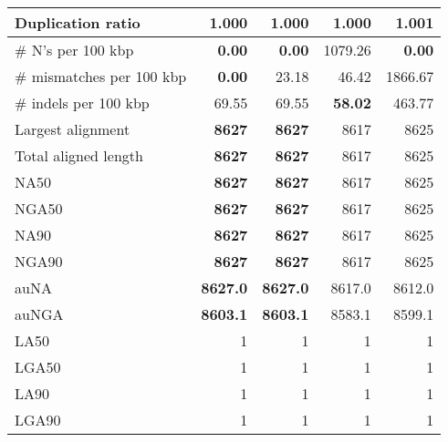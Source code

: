 \documentclass[12pt,a4paper]{article}
\begin{document}
\begin{table}[ht]
\begin{center}
\begin{tabular}{|l*{4}{|r}|}
Duplication ratio & {\bf 1.000} & {\bf 1.000} & {\bf 1.000} & 1.001 \\ \hline
\# N's per 100 kbp & {\bf 0.00} & {\bf 0.00} & 1079.26 & {\bf 0.00} \\ \hline
\# mismatches per 100 kbp & {\bf 0.00} & 23.18 & 46.42 & 1866.67 \\ \hline
\# indels per 100 kbp & 69.55 & 69.55 & {\bf 58.02} & 463.77 \\ \hline
Largest alignment & {\bf 8627} & {\bf 8627} & 8617 & 8625 \\ \hline
Total aligned length & {\bf 8627} & {\bf 8627} & 8617 & 8625 \\ \hline
NA50 & {\bf 8627} & {\bf 8627} & 8617 & 8625 \\ \hline
NGA50 & {\bf 8627} & {\bf 8627} & 8617 & 8625 \\ \hline
NA90 & {\bf 8627} & {\bf 8627} & 8617 & 8625 \\ \hline
NGA90 & {\bf 8627} & {\bf 8627} & 8617 & 8625 \\ \hline
auNA & {\bf 8627.0} & {\bf 8627.0} & 8617.0 & 8612.0 \\ \hline
auNGA & {\bf 8603.1} & {\bf 8603.1} & 8583.1 & 8599.1 \\ \hline
LA50 & 1 & 1 & 1 & 1 \\ \hline
LGA50 & 1 & 1 & 1 & 1 \\ \hline
LA90 & 1 & 1 & 1 & 1 \\ \hline
LGA90 & 1 & 1 & 1 & 1 \\ \hline
\end{tabular}
\end{center}
\end{table}
\end{document}
